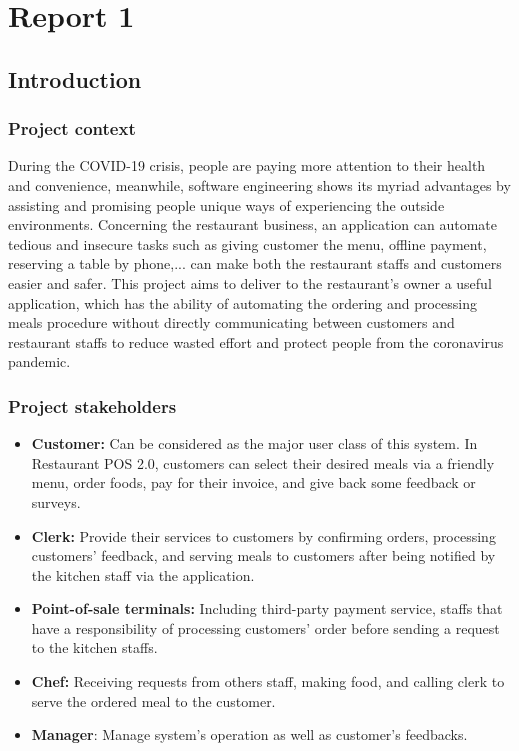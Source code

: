 \documentclass[11pt]{article}
\begin{document}
\newpage

\tableofcontents 
\cleardoublepage
{}          %
\pagebreak
\section{Report 1}
    \subsection{Introduction}
    \subsubsection*{Project context}
    During the COVID-19 crisis, people are paying more attention to their health and convenience, meanwhile, software engineering shows its myriad advantages by assisting and promising people unique ways of experiencing the outside environments. Concerning the restaurant business, an application can automate tedious and insecure tasks such as giving customer the menu, offline payment, reserving a table by phone,... can make both the restaurant staffs and customers easier and safer. This project aims to deliver to the restaurant's owner a useful application, which has the ability of automating the ordering and processing meals procedure without directly communicating between customers and restaurant staffs to reduce wasted effort and protect people from the coronavirus pandemic.
    \subsubsection*{Project stakeholders}
    \begin{itemize}
        \item \textbf{Customer:} Can be considered as the major user class of this system. In Restaurant POS 2.0, customers can select their desired meals via a friendly menu, order foods, pay for their invoice, and give back some feedback or surveys. 
        \item \textbf{Clerk:} Provide their services to customers by confirming orders, processing customers' feedback, and serving meals to customers after being notified by the kitchen staff via the application.
        \item \textbf{Point-of-sale terminals:} Including third-party payment service, staffs that have a responsibility of processing customers' order before sending a request to the kitchen staffs.
        \item \textbf{Chef:} Receiving requests from others staff, making food, and calling clerk to serve the ordered meal to the customer.
        \item \textbf{Manager}: Manage system's operation as well as customer's feedbacks.
    \end{itemize}
\end{document}
